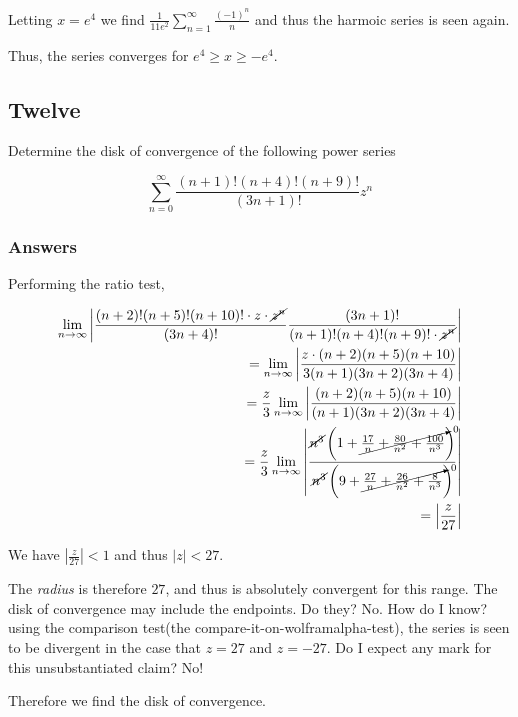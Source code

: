 \documentclass{article}
\begin{document}
Letting $x = e^4$ we find $\frac{1}{11e^2} \sum_{n=1}^{\infty} \frac{(-1)^n}{n}$ and thus the harmoic series is seen again.

Thus, the series converges for $e^4 \geq x \geq -e^4$.
\par

\subsection*{Twelve}

Determine the disk of convergence of the following power series

\begin{equation}\label{c12}
\sum_{n=0}^{\infty} \frac {(n+1)!(n+4)!(n+9)!}{(3n+1)!}z^n
\end{equation}

\subsubsection*{Answers}

Performing the ratio test,

\begin{align*}
\lim_{n\to\infty}\left| \frac{(n+2)!(n+5)!(n+10)! \cdot z \cdot \cancel{z^n}}{(3n+4)!} \frac{(3n+1)!}{(n+1)!(n+4)!(n+9)! \cdot \cancel{z^n}} \right| \\
= \lim_{n\to\infty}\left| \frac{z\cdot (n+2)(n+5)(n+10)}{3(n+1)(3n+2)(3n+4)}\right| \\
= \frac{z}{3} \lim_{n\to\infty}\left| \frac{(n+2)(n+5)(n+10)}{(n+1)(3n+2)(3n+4)} \right|\\
= \frac{z}{3} \lim_{n\to\infty}\left| \frac{\cancel{n^3}\left(1+\cancelto{0}{\frac{17}{n}+\frac{80}{n^2}+\frac{100}{n^3}} \right) }{\cancel{n^3}\left(9+\cancelto{0}{\frac{27}{n}+\frac{26}{n^2}+\frac{8}{n^3}}\right)}\right| \\
= \left|\frac{z}{27}\right|
\end{align*}

We have $\left|\frac{z}{27}\right| < 1$ and thus $\left|z\right| < 27$.

The \textit{radius} is therefore $27$, and thus is absolutely convergent for this range.
The disk of convergence may include the endpoints. Do they? No. How do I know? using the comparison test(the compare-it-on-wolframalpha-test), the series is seen to be divergent in the case that $z = 27$ and $z = -27$. Do I expect any mark for this unsubstantiated claim? No!

Therefore we find the disk of convergence. 
\end{document}
